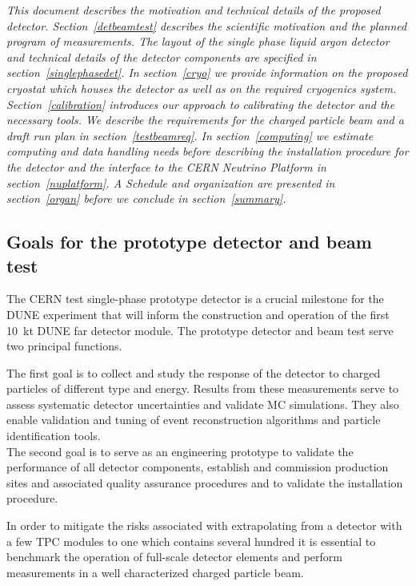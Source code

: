 
{\it 
This document describes the motivation and technical details of the proposed detector. Section~\ref{detbeamtest} describes the scientific motivation and the planned program of measurements. The layout of the single phase liquid argon detector and technical details of the detector components are specified in section~\ref{singlephasedet}. In section~\ref{cryo} we provide information on the proposed cryostat which houses the detector as well as on the required cryogenics system. Section~\ref{calibration} introduces our approach to calibrating the detector and the necessary tools. We describe the requirements for the charged particle beam and a draft run plan in section~\ref{testbeamreq}.
In section~\ref{computing} we estimate computing and data handling needs before describing the installation procedure for the detector
and the interface to the CERN Neutrino Platform in section~\ref{nuplatform}. A Schedule and organization are presented in section~\ref{organ} before we conclude in section~\ref{summary}.}


\subsection{Goals for the prototype detector and beam test}


The CERN test single-phase prototype detector is a crucial milestone for the DUNE experiment that will inform the construction and operation of the first 10~kt DUNE far detector module.  The prototype detector and beam test serve two principal functions. 

The first goal is 
to collect and study the response of the detector to charged particles of different type and energy. 
Results from these measurements serve to assess systematic detector uncertainties and
validate MC simulations. They also enable validation and tuning of event reconstruction algorithms and particle identification tools.\\

The second goal is 
to serve as an engineering prototype to validate the performance of all detector components,
establish and commission production sites and associated quality assurance procedures and to validate the installation procedure. 

In order to mitigate the risks associated with extrapolating 
from a detector with a few TPC modules to one which contains several hundred 
 it is essential to benchmark the operation of full-scale detector elements
and perform measurements in a well characterized charged particle beam.  

